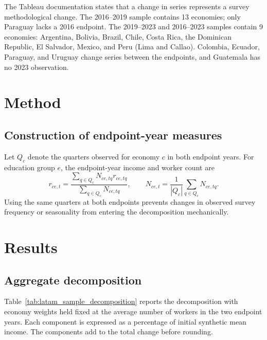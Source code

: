 \documentclass[11pt]{article}
\begin{document}
The Tableau documentation states that a change in series represents a survey
methodological change. The 2016--2019 sample contains 13 economies; only
Paraguay lacks a 2016 endpoint. The 2019--2023 and 2016--2023 samples contain
9 economies: Argentina, Bolivia, Brazil, Chile, Costa Rica, the Dominican
Republic, El Salvador, Mexico, and Peru (Lima and Callao). Colombia, Ecuador,
Paraguay, and Uruguay change series between the endpoints, and Guatemala has
no 2023 observation.

\section{Method}

\subsection{Construction of endpoint-year measures}

Let \(Q_c\) denote the quarters observed for economy \(c\) in both endpoint
years. For education group \(e\), the endpoint-year income and worker count
are
\begin{equation}
  r_{ce,t}
  =
  \frac{\sum_{q\in Q_c} N_{ce,tq}r_{ce,tq}}
       {\sum_{q\in Q_c} N_{ce,tq}},
  \qquad
  N_{ce,t}
  =
  \frac{1}{|Q_c|}
  \sum_{q\in Q_c}N_{ce,tq}.
  \label{eq:latam_endpoint_aggregation}
\end{equation}
Using the same quarters at both endpoints prevents changes in observed survey
frequency or seasonality from entering the decomposition mechanically.





\section{Results}

\subsection{Aggregate decomposition}

Table~\ref{tab:latam_sample_decomposition} reports the decomposition with
economy weights held fixed at the average number of workers in the two
endpoint years. Each component is expressed as a percentage of initial
synthetic mean income. The components add to the total change before
rounding.
\end{document}
